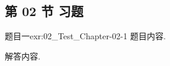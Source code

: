 \subsection{第 02 节 习题}


\begin{exercise}{题目一}{exr:02_Test_Chapter-02-1}
    题目内容.
\end{exercise}

\begin{solution}
    解答内容.
\end{solution}
